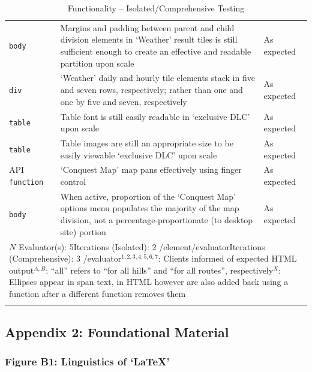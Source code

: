 \documentclass[11pt, english]{article}
\begin{document}
\begin{center}
\begin{longtable}{p{3cm}p{8cm}p{2cm}}
		\texttt{body} & Margins and padding between parent and child division elements in `Weather' result tiles is still sufficient enough to create an effective and readable partition upon scale & As expected\\
		\texttt{div} & `Weather' daily and hourly tile elements stack in five and seven rows, respectively; rather than one and one by five and seven, respectively & As expected\\
		\texttt{table} & Table font is still easily readable in `exclusive DLC' upon scale & As expected\\
		\texttt{table} & Table images are still an appropriate size to be easily viewable `exclusive DLC' upon scale & As expected\\
		API \texttt{function} & `Conquest Map' map pans effectively using finger control & As expected\\
		\texttt{body} & When active, proportion of the `Conquest Map' options menu populates the majority of the map division, not a percentage-proportionate (to desktop site) portion & As expected\\
		\hline
		\multicolumn{3}{p{12.5cm}}{$N$ Evaluator(s): 5\newline Iterations (Isolated): 2 /element/evaluator\newline Iterations (Comprehensive): 3 /evaluator\newline $^{1,2,3,4,5,6,7}$: Clients informed of expected HTML output\newline $^{A,B}$: ``all'' refers to ``for all hills'' and ``for all routes'', respectively\newline $^{X}$: Ellipses appear in span text, in HTML however are also added back using a function after a different function removes them}\\
		\hline
		\caption{Functionality -- Isolated/Comprehensive Testing}
	\end{longtable}
	\end{center}

\newpage

	\subsection*{Appendix 2: Foundational Material}

		\subsubsection*{Figure B1: Linguistics of `{\LaTeX}'}
\end{document}
